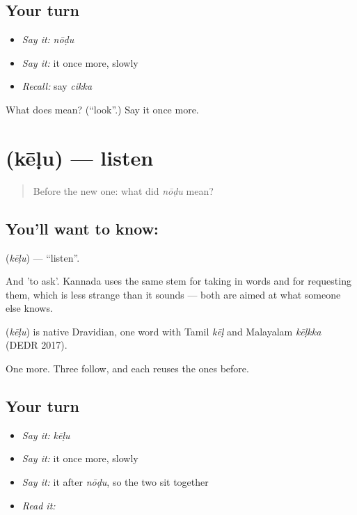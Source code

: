 \subsection*{Your turn}
\begin{itemize}
\raggedright
  \item \emph{Say it:} \emph{nōḍu}
  \item \emph{Say it:} it once more, slowly
  \item \emph{Recall:} say \emph{cikka}
\end{itemize}

\begin{tcolorbox}[breakable,colback=teal!4,colframe=teal!35!black,title={Before you move on}]
What does  mean? (\textquotedblleft{}look\textquotedblright{}.) Say it once more.
\end{tcolorbox}
\section[\texorpdfstring{\kn{ಕೇಳು} (kēḷu)}{ಕೇಳು (kēḷu)}]{ (kēḷu) — listen}

\label{lesson:KA-C44-listen}



\begin{quote}
Before the new one: what did \emph{nōḍu} mean?
\end{quote}

\subsection*{You'll want to know: }
\textbf{} (\emph{kēḷu}) — \textquotedblleft{}listen\textquotedblright{}.

And 'to ask'. Kannada uses the same stem for taking in words and for requesting them, which is less strange than it sounds — both are aimed at what someone else knows.

\begin{cousinweb}
\textbf{} (\emph{kēḷu}) is native Dravidian, one word with Tamil \emph{kēḷ} and Malayalam \emph{kēḷkka} (DEDR 2017).
\end{cousinweb}

\begin{grammarlens}[title={What you've built}]
One more. Three follow, and each reuses the ones before.
\end{grammarlens}

\subsection*{Your turn}
\begin{itemize}
\raggedright
  \item \emph{Say it:} \emph{kēḷu}
  \item \emph{Say it:} it once more, slowly
  \item \emph{Say it:} it after \emph{nōḍu}, so the two sit together
  \item \emph{Read it:} \textbf{}
\end{itemize}

